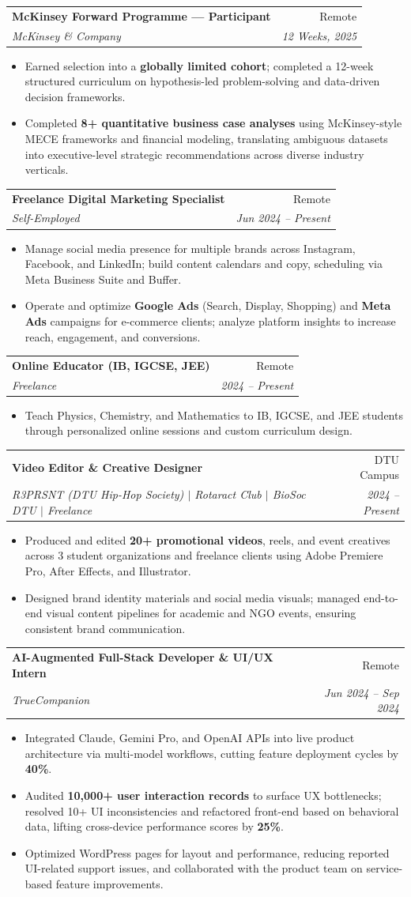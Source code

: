 \documentclass[letterpaper,10.5pt]{article}
\makeatletter
\newcommand{\resumeItem}[1]{
  \item\small{#1 \vspace{-2pt}}
}
\newcommand{\resumeSubheading}[4]{
  \vspace{-2pt}\item
    \begin{tabular*}{0.97\textwidth}[t]{l@{\extracolsep{\fill}}r}
      \textbf{#1} & \small #2 \\
      \textit{\small#3} & \textit{\small #4} \\
    \end{tabular*}\vspace{-5pt}
}
\newcommand{\resumeItemListStart}{\begin{itemize}[leftmargin=0.18in]}
\newcommand{\resumeItemListEnd}{\end{itemize}\vspace{-4pt}}
\makeatother
\begin{document}
  \resumeSubheading
    {McKinsey Forward Programme --- Participant}{Remote}
    {McKinsey \& Company}{12 Weeks, 2025}
    \resumeItemListStart
      \resumeItem{Earned selection into a \textbf{globally limited cohort}; completed a 12-week structured curriculum on hypothesis-led problem-solving and data-driven decision frameworks.}
      \resumeItem{Completed \textbf{8+ quantitative business case analyses} using McKinsey-style MECE frameworks and financial modeling, translating ambiguous datasets into executive-level strategic recommendations across diverse industry verticals.}
    \resumeItemListEnd

  \resumeSubheading
    {Freelance Digital Marketing Specialist}{Remote}
    {Self-Employed}{Jun 2024 -- Present}
    \resumeItemListStart
      \resumeItem{Manage social media presence for multiple brands across Instagram, Facebook, and LinkedIn; build content calendars and copy, scheduling via Meta Business Suite and Buffer.}
      \resumeItem{Operate and optimize \textbf{Google Ads} (Search, Display, Shopping) and \textbf{Meta Ads} campaigns for e-commerce clients; analyze platform insights to increase reach, engagement, and conversions.}
    \resumeItemListEnd

  \resumeSubheading
    {Online Educator (IB, IGCSE, JEE)}{Remote}
    {Freelance}{2024 -- Present}
    \resumeItemListStart
      \resumeItem{Teach Physics, Chemistry, and Mathematics to IB, IGCSE, and JEE students through personalized online sessions and custom curriculum design.}
    \resumeItemListEnd

  \resumeSubheading
    {Video Editor \& Creative Designer}{DTU Campus}
    {R3PRSNT (DTU Hip-Hop Society) $|$ Rotaract Club $|$ BioSoc DTU $|$ Freelance}{2024 -- Present}
    \resumeItemListStart
      \resumeItem{Produced and edited \textbf{20+ promotional videos}, reels, and event creatives across 3 student organizations and freelance clients using Adobe Premiere Pro, After Effects, and Illustrator.}
      \resumeItem{Designed brand identity materials and social media visuals; managed end-to-end visual content pipelines for academic and NGO events, ensuring consistent brand communication.}
    \resumeItemListEnd

  \resumeSubheading
    {AI-Augmented Full-Stack Developer \& UI/UX Intern}{Remote}
    {TrueCompanion}{Jun 2024 -- Sep 2024}
    \resumeItemListStart
      \resumeItem{Integrated Claude, Gemini Pro, and OpenAI APIs into live product architecture via multi-model workflows, cutting feature deployment cycles by \textbf{40\%}.}
      \resumeItem{Audited \textbf{10,000+ user interaction records} to surface UX bottlenecks; resolved 10+ UI inconsistencies and refactored front-end based on behavioral data, lifting cross-device performance scores by \textbf{25\%}.}
      \resumeItem{Optimized WordPress pages for layout and performance, reducing reported UI-related support issues, and collaborated with the product team on service-based feature improvements.}
    \resumeItemListEnd
\end{document}
